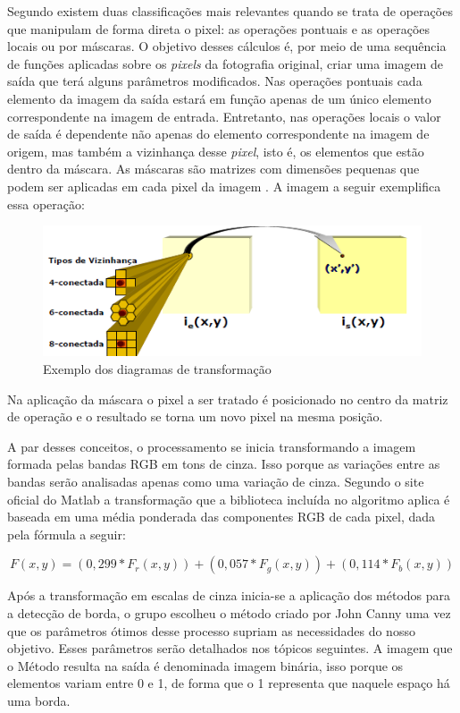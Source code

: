\documentclass[12pt]{article}
\begin{document}
	Segundo \cite{de2006introduccao} existem duas classificações mais relevantes quando se trata de operações que manipulam de forma direta o pixel: as operações pontuais e as operações locais ou por máscaras. O objetivo desses cálculos é, por meio de uma sequência de funções aplicadas sobre os \textit{pixels} da fotografia original, criar uma imagem de saída que terá alguns parâmetros modificados. Nas operações pontuais cada elemento da imagem da saída estará em função apenas de um único elemento correspondente na imagem de entrada. Entretanto, nas operações locais o valor de saída é dependente não apenas do elemento correspondente na imagem de origem, mas também a vizinhança desse \textit{pixel}, isto é, os elementos que estão dentro da máscara. As máscaras são matrizes com dimensões pequenas que podem ser aplicadas em cada pixel da imagem \cite{silva2000segmentaccao}. A imagem a seguir exemplifica essa operação:
	
	\begin{figure}[h!]
		\centering
		\includegraphics[width=0.7\linewidth]{img/f8d}
		\caption{Exemplo dos diagramas de transformação \citep{de2006introduccao}}
		\label{fig:f8d}
	\end{figure}
	
	Na aplicação da máscara o pixel a ser tratado é posicionado no centro da matriz de operação e o resultado se torna um novo pixel na mesma posição. 
	
	A par desses conceitos, o processamento se inicia transformando a imagem formada pelas bandas RGB em tons de cinza. Isso porque as variações entre as bandas serão analisadas apenas como uma variação de cinza. Segundo o site oficial do Matlab \cite{Matlab} a transformação que a biblioteca incluída no algoritmo aplica é baseada em uma média ponderada das componentes RGB de cada pixel, dada pela fórmula a seguir:
	
	\begin{equation}
	F(x,y)=(0,299*F_r(x,y))+(0,057*F_g(x,y))+(0,114*F_b(x,y))
	\end{equation} 
			
	Após a transformação em escalas de cinza inicia-se a aplicação dos métodos para a detecção de borda, o grupo escolheu o método criado por John Canny uma vez que os parâmetros ótimos desse processo supriam as necessidades do nosso objetivo.  Esses parâmetros serão detalhados nos tópicos seguintes. A imagem que o Método resulta na saída é denominada imagem binária, isso porque os elementos variam entre 0 e 1, de forma que o 1 representa que naquele espaço há uma borda.
	
\end{document}
